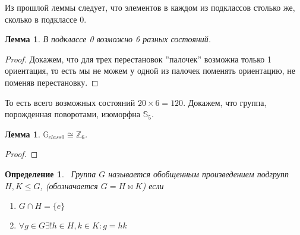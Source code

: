 \documentclass[utf8,a4paper,draft]{article}
\newtheorem*{lemma3_cub}{Лемма}
\newtheorem*{lemma4_cub}{Лемма}
\newtheorem*{def_cub}{Определение}
\begin{document}
Из прошлой леммы следует, что элементов в каждом из подклассов столько же, сколько в подклассе 0.
\begin{lemma3_cub}
В подклассе 0 возможно 6 разных состояний.
\end{lemma3_cub}
\begin{proof}
Докажем, что для трех перестановок ''палочек'' возможна только 1 ориентация, то есть мы не можем у одной из палочек поменять ориентацию, не поменяв перестановку.
\end{proof}
То есть всего возможных состояний $20\times 6=120$.
Докажем, что группа, порожденная поворотами, изоморфна $\mathbb{S}_5$.
\begin{lemma4_cub}
$\mathbb{G}_{class 0} \cong \mathbb{Z}_6$.
\end{lemma4_cub}
\begin{proof}
\end{proof}
\begin{def_cub}
\ Группа $G$ называется обобщенным произведением подгрупп $H,K\le G$, (обозначается $G=H \bowtie K $) если
\begin{enumerate}
\item $G\cap H=\{e\}$
\item $\forall g \in G \exists! h \in H, k\in K: g=hk$
\end{enumerate}
\end{def_cub}
\end{document}
